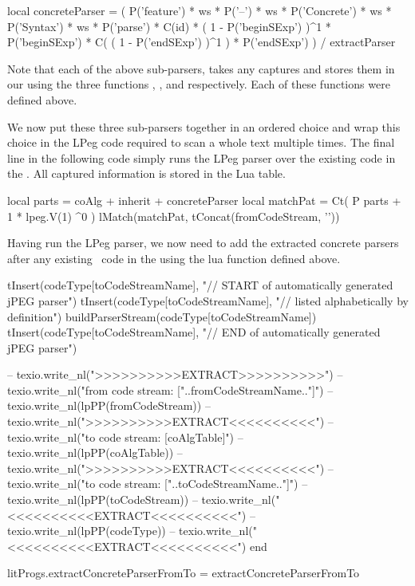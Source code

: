 \startLuaCode
  local concreteParser   = (
    P('feature') * ws * P('--') * ws * 
    P('Concrete') * ws * P('Syntax') * ws *
    P('parse') * C(id) * 
    ( 1 - P('beginSExp') )^1 *  P('beginSExp') *
    C( ( 1 - P('endSExp') )^1 ) * P('endSExp')
    ) / extractParser
\stopLuaCode

\stopitemize

Note that each of the above sub-parsers, takes any captures and stores 
them in our  using the three functions 
, , and  
respectively. Each of these functions were defined above.

We now put these three sub-parsers together in an ordered choice and wrap 
this choice in the LPeg code required to scan a whole text multiple times. 
The final line in the following code simply runs the LPeg parser over the 
existing code in the . All captured information is 
stored in the  Lua table. 

\startLuaCode
  local parts    = coAlg + inherit + concreteParser
  local matchPat = Ct( P{ parts + 1 * lpeg.V(1) }^0 )
  lMatch(matchPat, tConcat(fromCodeStream, '\n\n'))
\stopLuaCode

Having run the LPeg parser, we now need to add the extracted concrete 
parsers after any existing \joylol\ code in the  using 
the lua function  defined above.

\startLuaCode
  tInsert(codeType[toCodeStreamName], 
    "// START of automatically generated jPEG parser")
  tInsert(codeType[toCodeStreamName],
    "// listed alphabetically by definition")
  buildParserStream(codeType[toCodeStreamName])
  tInsert(codeType[toCodeStreamName], 
    "// END of automatically generated jPEG parser")
  
--  texio.write_nl(">>>>>>>>>>EXTRACT>>>>>>>>>>")
--  texio.write_nl("from code stream: ["..fromCodeStreamName.."]")
--  texio.write_nl(lpPP(fromCodeStream))
--  texio.write_nl(">>>>>>>>>>EXTRACT<<<<<<<<<<")
--  texio.write_nl("to code stream: [coAlgTable]")
--  texio.write_nl(lpPP(coAlgTable))
--  texio.write_nl(">>>>>>>>>>EXTRACT<<<<<<<<<<")
--  texio.write_nl("to code stream: ["..toCodeStreamName.."]")
--  texio.write_nl(lpPP(toCodeStream))  
--  texio.write_nl("<<<<<<<<<<EXTRACT<<<<<<<<<<\n")
--  texio.write_nl(lpPP(codeType))
--  texio.write_nl("<<<<<<<<<<EXTRACT<<<<<<<<<<\n")
end

litProgs.extractConcreteParserFromTo = extractConcreteParserFromTo
\stopLuaCode


